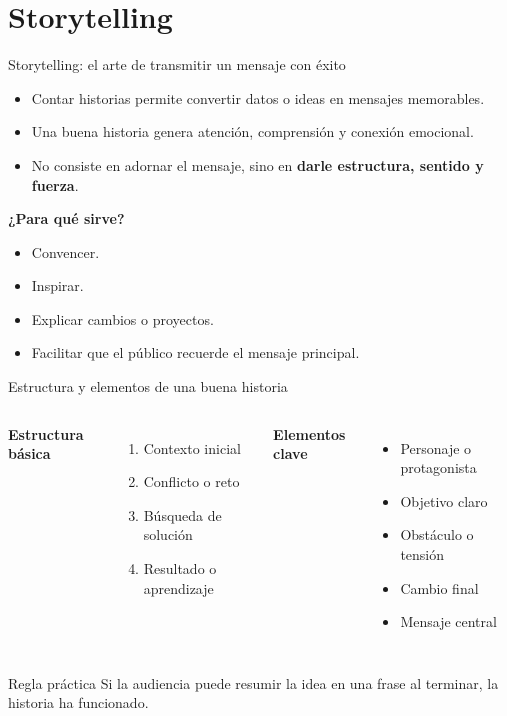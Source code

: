 \documentclass{beamer}
\begin{document}
\section{Storytelling}

\begin{frame}{Storytelling: el arte de transmitir un mensaje con éxito}
\begin{itemize}
    \item Contar historias permite convertir datos o ideas en mensajes memorables.
    \item Una buena historia genera atención, comprensión y conexión emocional.
    \item No consiste en adornar el mensaje, sino en \textbf{darle estructura, sentido y fuerza}.
\end{itemize}

\vspace{0.3cm}
\textbf{¿Para qué sirve?}
\begin{itemize}
    \item Convencer.
    \item Inspirar.
    \item Explicar cambios o proyectos.
    \item Facilitar que el público recuerde el mensaje principal.
\end{itemize}
\end{frame}

\begin{frame}{Estructura y elementos de una buena historia}
\begin{columns}[T,onlytextwidth]
\textbf{Estructura básica}
\begin{enumerate}
    \item Contexto inicial
    \item Conflicto o reto
    \item Búsqueda de solución
    \item Resultado o aprendizaje
\end{enumerate}

\textbf{Elementos clave}
\begin{itemize}
    \item Personaje o protagonista
    \item Objetivo claro
    \item Obstáculo o tensión
    \item Cambio final
    \item Mensaje central
\end{itemize}
\end{columns}

\vspace{0.25cm}
\begin{block}{Regla práctica}
Si la audiencia puede resumir la idea en una frase al terminar, la historia ha funcionado.
\end{block}
\end{frame}
\end{document}

